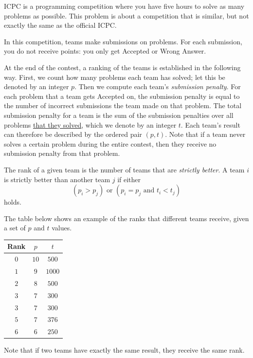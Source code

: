 ICPC is a programming competition where you have five hours to solve as many problems as possible.
This problem is about a competition that is similar, but not exactly the same as the official ICPC.

In this competition, teams make submissions on problems.
For each submission, you do not receive points: you only get Accepted or Wrong Answer.

At the end of the contest, a ranking of the teams is established in the following way.
First, we count how many problems each team has solved; let this be denoted by an integer $p$.
Then we compute each team's \textit{submission penalty}.
For each problem that a team gets Accepted on, the submission penalty is equal to the number of
incorrect submissions the team made on that problem.
The total submission penalty for a team is the sum of the submission penalties over all problems
\underline{that they solved}, which we denote by an integer $t$.
Each team's result can therefore be described by the ordered pair $(p, t)$.
Note that if a team never solves a certain problem during the entire contest, then they receive
no submission penalty from that problem.

The rank of a given team is the number of teams that are \textit{strictly better}.
A team $i$ is strictly better than another team $j$ if either
\[
(p_i > p_j) \text{ or } (p_i = p_j \text{ and } t_i < t_j)
\]
holds.

The table below shows an example of the ranks that different teams receive, given a set of $p$
and $t$ values.

\begin{center}
\begin{tabular}{| c | c | c |}
  \hline
  Rank & $p$ & $t$ \\ \hline
  $0$ & $10$ & $500$ \\ \hline
  $1$ & $9$ & $1000$ \\ \hline
  $2$ & $8$ & $500$ \\ \hline
  $3$ & $7$ & $300$ \\ \hline
  $3$ & $7$ & $300$ \\ \hline
  $5$ & $7$ & $376$ \\ \hline
  $6$ & $6$ & $250$ \\ \hline
\end{tabular}
\end{center}

Note that if two teams have exactly the same result, they receive the same rank.

